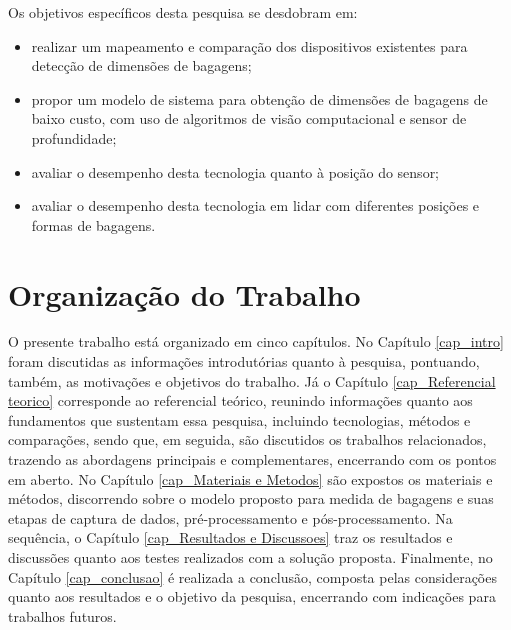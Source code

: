 Os objetivos específicos desta pesquisa se desdobram em:
\begin{itemize}
    \item realizar um mapeamento e comparação dos dispositivos existentes para detecção de dimensões de bagagens;
    \item propor um modelo de sistema para obtenção de dimensões de bagagens de baixo custo, com uso de algoritmos de visão computacional e sensor de profundidade;
    \item avaliar o desempenho desta tecnologia quanto à posição do sensor;
    \item avaliar o desempenho desta tecnologia em lidar com diferentes posições e formas de bagagens.
\end{itemize}

\section{Organização do Trabalho}
\label{sec_OrganizacaoDoTexto}

O presente trabalho está organizado em cinco capítulos. No Capítulo \ref{cap_intro} foram discutidas as informações introdutórias quanto à pesquisa, pontuando, também, as motivações e objetivos do trabalho. Já o Capítulo \ref{cap_Referencial teorico} corresponde ao referencial teórico, reunindo informações quanto aos fundamentos que sustentam essa pesquisa, incluindo tecnologias, métodos e comparações, sendo que, em seguida, são discutidos os trabalhos relacionados, trazendo as abordagens principais e complementares, encerrando com os pontos em aberto. No Capítulo \ref{cap_Materiais e Metodos} são expostos os materiais e métodos, discorrendo sobre o modelo proposto para medida de bagagens e suas etapas de captura de dados, pré-processamento e pós-processamento. Na sequência, o Capítulo \ref{cap_Resultados e Discussoes} traz os resultados e discussões quanto aos testes realizados com a solução proposta. Finalmente, no Capítulo \ref{cap_conclusao} é realizada a conclusão, composta pelas considerações quanto aos resultados e o objetivo da pesquisa, encerrando com indicações para trabalhos futuros.  